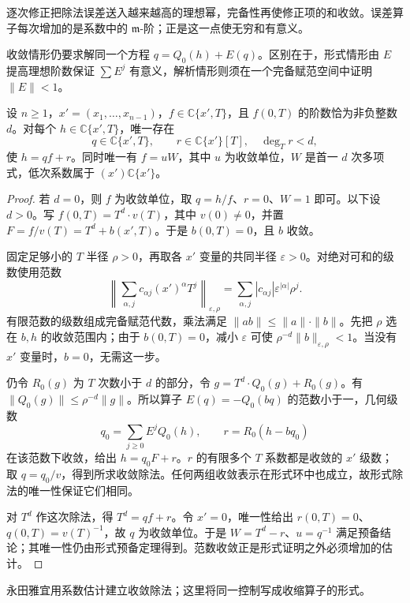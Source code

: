 逐次修正把除法误差送入越来越高的理想幂，完备性再使修正项的和收敛。误差算子每次增加的是系数中的 \(\mathfrak m\)-阶；正是这一点使无穷和有意义。

收敛情形仍要求解同一个方程 \(q=Q_0(h)+E(q)\)。区别在于，形式情形由 \(E\) 提高理想阶数保证 \(\sum E^j\) 有意义，解析情形则须在一个完备赋范空间中证明 \(\|E\|<1\)。

\begin{theorem}\label{b3:thm:analytic-weierstrass}
	设 \(n\ge1\)，\(x'=(x_1,\ldots,x_{n-1})\)，\(f\in\mathbb C\{x',T\}\)，且 \(f(0,T)\) 的阶数恰为非负整数 \(d\)。对每个 \(h\in\mathbb C\{x',T\}\)，唯一存在
	\[
		q\in\mathbb C\{x',T\},\qquad r\in\mathbb C\{x'\}[T],\quad\deg_T r<d,
	\]
	使 \(h=qf+r\)。同时唯一有 \(f=uW\)，其中 \(u\) 为收敛单位，\(W\) 是首一 \(d\) 次多项式，低次系数属于 \((x')\mathbb C\{x'\}\)。
\end{theorem}

\begin{proof}
	若 \(d=0\)，则 \(f\) 为收敛单位，取 \(q=h/f\)、\(r=0\)、\(W=1\) 即可。以下设 \(d>0\)。写 \(f(0,T)=T^d\cdot v(T)\)，其中 \(v(0)\ne0\)，并置 \(F=f/v(T)=T^d+b(x',T)\)。于是 \(b(0,T)=0\)，且 \(b\) 收敛。

	固定足够小的 \(T\) 半径 \(\rho>0\)，再取各 \(x'\) 变量的共同半径 \(\varepsilon>0\)。对绝对可和的级数使用范数
	\[
		\left\|\sum_{\alpha,j}c_{\alpha j}(x')^\alpha T^j\right\|_{\varepsilon,\rho} =\sum_{\alpha,j}|c_{\alpha j}|\varepsilon^{|\alpha|}\rho^j.
	\]
	有限范数的级数组成完备赋范代数，乘法满足 \(\|ab\|\le\|a\|\cdot\|b\|\)。先把 \(\rho\) 选在 \(b,h\) 的收敛范围内；由于 \(b(0,T)=0\)，减小 \(\varepsilon\) 可使 \(\rho^{-d}\|b\|_{\varepsilon,\rho}<1\)。当没有 \(x'\) 变量时，\(b=0\)，无需这一步。

	仍令 \(R_0(g)\) 为 \(T\) 次数小于 \(d\) 的部分，令 \(g=T^d\cdot Q_0(g)+R_0(g)\)。有 \(\|Q_0(g)\|\le\rho^{-d}\|g\|\)。所以算子 \(E(q)=-Q_0(bq)\) 的范数小于一，几何级数
	\[
		q_0=\sum_{j\ge0}E^jQ_0(h),\qquad r=R_0(h-bq_0)
	\]
	在该范数下收敛，给出 \(h=q_0F+r\)。\(r\) 的有限多个 \(T\) 系数都是收敛的 \(x'\) 级数；取 \(q=q_0/v\)，得到所求收敛除法。任何两组收敛表示在形式环中也成立，故形式除法的唯一性保证它们相同。

	对 \(T^d\) 作这次除法，得 \(T^d=qf+r\)。令 \(x'=0\)，唯一性给出 \(r(0,T)=0\)、\(q(0,T)=v(T)^{-1}\)，故 \(q\) 为收敛单位。于是 \(W=T^d-r\)、\(u=q^{-1}\) 满足预备结论；其唯一性仍由形式预备定理得到。范数收敛正是形式证明之外必须增加的估计。
\end{proof}

永田雅宜\cite[(45.3), pp. 191--193]{Nagata1975LocalRings}用系数估计建立收敛除法；这里将同一控制写成收缩算子的形式。

